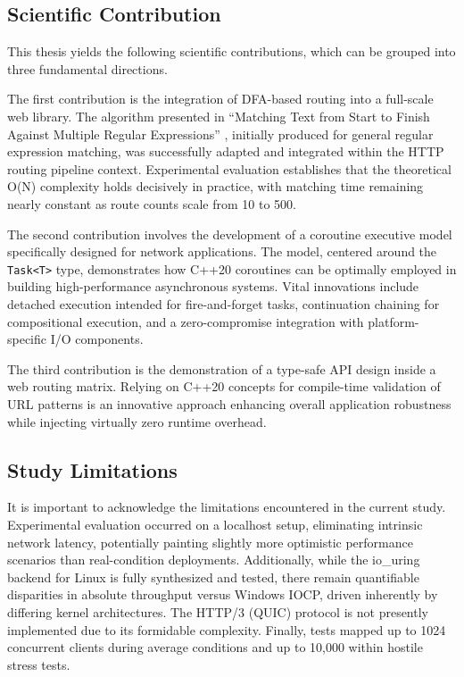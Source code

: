\subsection{Scientific Contribution}

This thesis yields the following scientific contributions, which can be grouped into three fundamental directions.

The first contribution is the integration of DFA-based routing into a full-scale web library. The algorithm presented in ``Matching Text from Start to Finish Against Multiple Regular Expressions'' \cite{stankov2024regex}, initially produced for general regular expression matching, was successfully adapted and integrated within the HTTP routing pipeline context. Experimental evaluation establishes that the theoretical O(N) complexity holds decisively in practice, with matching time remaining nearly constant as route counts scale from 10 to 500.

The second contribution involves the development of a coroutine executive model specifically designed for network applications. The model, centered around the \texttt{Task<T>} type, demonstrates how C++20 coroutines can be optimally employed in building high-performance asynchronous systems. Vital innovations include detached execution intended for fire-and-forget tasks, continuation chaining for compositional execution, and a zero-compromise integration with platform-specific I/O components.

The third contribution is the demonstration of a type-safe API design inside a web routing matrix. Relying on C++20 concepts for compile-time validation of URL patterns is an innovative approach enhancing overall application robustness while injecting virtually zero runtime overhead.

\subsection{Study Limitations}

It is important to acknowledge the limitations encountered in the current study. Experimental evaluation occurred on a localhost setup, eliminating intrinsic network latency, potentially painting slightly more optimistic performance scenarios than real-condition deployments. Additionally, while the io\_uring backend for Linux is fully synthesized and tested, there remain quantifiable disparities in absolute throughput versus Windows IOCP, driven inherently by differing kernel architectures. The HTTP/3 (QUIC) protocol is not presently implemented due to its formidable complexity. Finally, tests mapped up to 1024 concurrent clients during average conditions and up to 10,000 within hostile stress tests.

